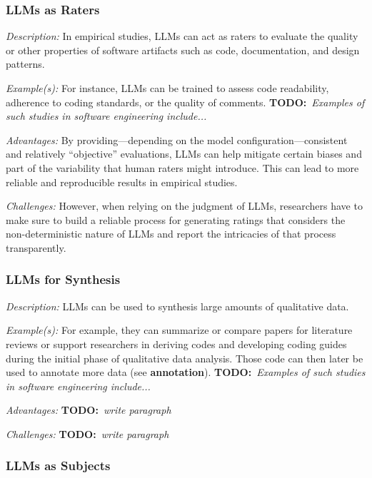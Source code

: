 \documentclass[11pt]{article}
\newcommand{\todo}[1]{{\textbf{TODO:}\ \textit{#1}}} %
\begin{document}
\subsubsection{LLMs as Raters}

\emph{Description:} In empirical studies, LLMs can act as raters to evaluate the quality or other properties of software artifacts such as code, documentation, and design patterns.

\emph{Example(s):}  For instance, LLMs can be trained to assess code readability, adherence to coding standards, or the quality of comments. \todo{Examples of such studies in software engineering include...}

\emph{Advantages:} By providing---depending on the model configuration---consistent and relatively ``objective'' evaluations, LLMs can help mitigate certain biases and part of the variability that human raters might introduce. 
This can lead to more reliable and reproducible results in empirical studies.

\emph{Challenges:} However, when relying on the judgment of LLMs, researchers have to make sure to build a reliable process for generating ratings that considers the non-deterministic nature of LLMs and report the intricacies of that process transparently.


\subsubsection{LLMs for Synthesis}

\emph{Description:} LLMs can be used to synthesis large amounts of qualitative data.

\emph{Example(s):}  For example, they can summarize or compare papers for literature reviews or support researchers in deriving codes and developing coding guides during the initial phase of qualitative data analysis. Those code can then later be used to annotate more data (see \textbf{annotation}). \todo{Examples of such studies in software engineering include...}

\emph{Advantages:} \todo{write paragraph}

\emph{Challenges:} \todo{write paragraph}


\subsubsection{LLMs as Subjects}
\end{document}

